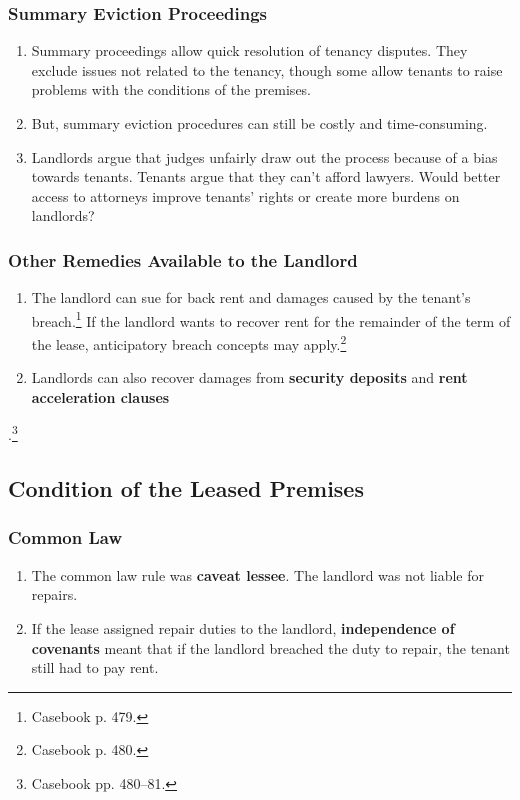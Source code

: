 \subsubsection{Summary Eviction Proceedings} 

\begin{enumerate}
    \item Summary proceedings allow quick resolution of tenancy disputes. They 
    exclude issues not related to the tenancy, though some allow tenants to 
    raise problems with the conditions of the premises.
    \item But, summary eviction procedures can still be costly and 
    time-consuming.
    \item Landlords argue that judges unfairly draw out the process because of 
    a bias towards tenants. Tenants argue that they can't afford lawyers.  
    Would better access to attorneys improve tenants' rights or create more 
    burdens on landlords?
\end{enumerate}

\subsubsection{Other Remedies Available to the Landlord}

\begin{enumerate}
    \item The landlord can sue for back rent and damages caused by the 
    tenant's breach.\footnote{Casebook p. 479.} If the landlord wants to 
    recover rent for the remainder of the term of the lease, anticipatory 
    breach concepts may apply.\footnote{Casebook p. 480.}
    \item Landlords can also recover damages from \textbf{security deposits} 
    and \textbf{rent acceleration clauses}
\end{enumerate}.\footnote{Casebook pp. 480--81.}

\subsection{Condition of the Leased Premises}

\subsubsection{Common Law}

\begin{enumerate}
    \item The common law rule was \textbf{caveat lessee}. The landlord was not 
    liable for repairs.
    \item If the lease assigned repair duties to the landlord, 
    \textbf{independence of covenants} meant that if the landlord breached the 
    duty to repair, the tenant still had to pay rent.
\end{enumerate}

